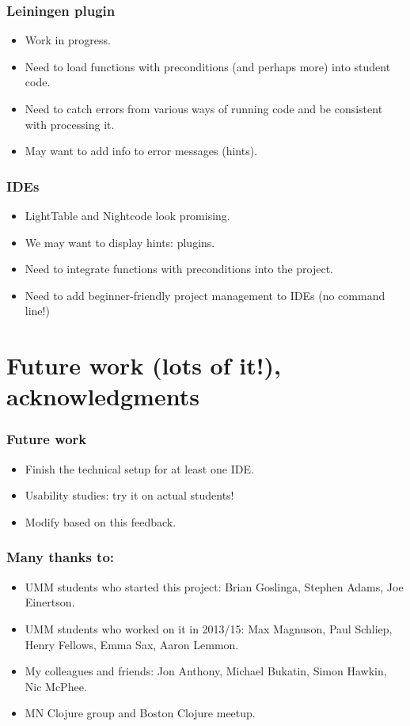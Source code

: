 \documentclass{beamer}
\begin{document}
\begin{frame}
   \frametitle{Leiningen plugin}
\begin{itemize}
\item Work in progress. 
\item Need to load functions with preconditions (and perhaps more) into student code. 
\item Need to catch errors from various ways of running code and be consistent with processing it.
\item May want to add info to error messages (hints). 
\end{itemize}
\end{frame}

\begin{frame}
   \frametitle{IDEs}
\begin{itemize}
\item LightTable and Nightcode look promising.
\item We may want to display hints: plugins. 
\item Need to integrate functions with preconditions into the project.
\item Need to add beginner-friendly project management to IDEs (no command line!)
\end{itemize}
\end{frame}

\section{Future work (lots of it!), acknowledgments}

\begin{frame}
   \frametitle{Future work}
\begin{itemize}
\item Finish the technical setup for at least one IDE.
\item Usability studies: try it on actual students!
\item Modify based on this feedback. 
\end{itemize}
\end{frame}

\begin{frame}
   \frametitle{Many thanks to:}
\begin{itemize}
\item UMM students who started this project: Brian Goslinga, Stephen Adams, Joe Einertson. 
\item UMM students who worked on it in 2013/15: Max Magnuson, Paul Schliep, Henry Fellows, Emma Sax, Aaron Lemmon. 
\item My colleagues and friends: Jon Anthony, Michael Bukatin, Simon Hawkin, Nic McPhee. 
\item MN Clojure group and Boston Clojure meetup. 
\end{itemize}
\end{frame}
\end{document}
